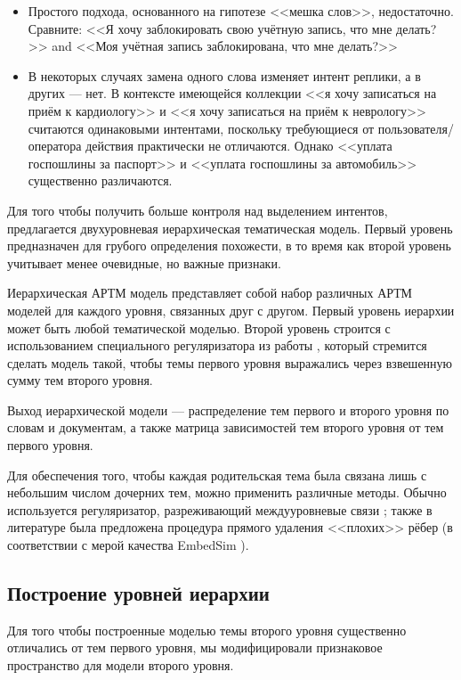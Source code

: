 \begin{itemize}
\item Простого подхода, основанного на гипотезе <<мешка слов>>, недостаточно. Сравните: <<Я хочу заблокировать свою учётную запись, что мне делать?>> and <<Моя учётная запись заблокирована, что мне делать?>>
\item В некоторых случаях замена одного слова изменяет интент реплики, а в других --- нет. В контексте имеющейся коллекции <<я хочу записаться на приём к кардиологу>> и <<я хочу записаться на приём к неврологу>> считаются одинаковыми интентами, поскольку требующиеся от пользователя/оператора действия практически не отличаются. Однако <<уплата госпошлины за паспорт>> и <<уплата госпошлины за автомобиль>> существенно различаются. 
\end{itemize}

Для того чтобы получить больше контроля над выделением интентов, предлагается двухуровневая иерархическая тематическая модель. Первый уровень предназначен для грубого определения похожести, в то время как второй уровень учитывает менее очевидные, но важные признаки.

Иерархическая АРТМ модель представляет собой набор различных АРТМ моделей для каждого уровня, связанных друг с другом. Первый уровень иерархии может быть любой тематической моделью. Второй уровень строится с использованием специального регуляризатора из работы \cite{chirkova2016additive}, который стремится сделать модель такой, чтобы темы первого уровня выражались через взвешенную сумму тем второго уровня.

Выход иерархической модели — распределение тем первого и второго уровня по словам и документам, а также матрица зависимостей тем второго уровня от тем первого уровня.

Для обеспечения того, чтобы каждая родительская тема была связана лишь с небольшим числом дочерних тем, можно применить различные методы. Обычно используется регуляризатор, разреживающий междууровневые связи \cite{chirkova2016additive} ; также в литературе была предложена процедура прямого удаления <<плохих>> рёбер (в соответствии с мерой качества EmbedSim \cite{belyy}).

\subsection{Построение уровней иерархии} \label{hierarchy_distinct}

Для того чтобы построенные моделью темы второго уровня существенно отличались от тем первого уровня, мы модифицировали признаковое пространство для модели второго уровня.

